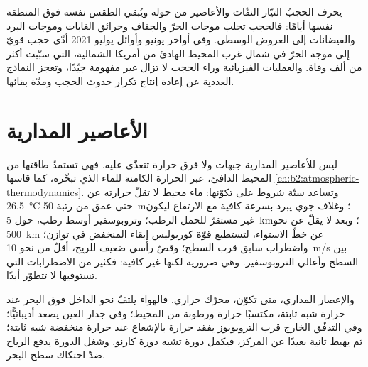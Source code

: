 يحرف الحجبُ التيّار النفّاث والأعاصير من حوله ويُبقي الطقس نفسه فوق المنطقة
نفسها أيامًا: فالحجب تجلب موجات الحرّ والجفاف وحرائق الغابات وموجات البرد والفيضانات إلى
العروض الوسطى. وفي أواخر يونيو وأوائل يوليو 2021 أدّى حجب قويّ إلى موجة الحرّ في
شمال غرب المحيط الهادئ من أمريكا الشمالية، التي سبّبت أكثر من ألف وفاة. والعمليات الفيزيائية
وراء الحجب لا تزال غير مفهومة جيّدًا، وتعجز النماذج العددية عن
إعادة إنتاج تكرار حدوث الحجب ومدّة بقائها.

\section{الأعاصير المدارية}\label{sec:b2:weather-systems:tropical}

ليس للأعاصير المدارية جبهات ولا فرق حرارة تتغذّى عليه. فهي تستمدّ طاقتها
من المحيط الدافئ، عبر الحرارة الكامنة للماء الذي تبخّره، كما قاسها \cref{ch:b2:atmospheric-thermodynamics}.
وتساعد ستّة شروط على تكوّنها: ماء محيط لا تقلّ حرارته عن \qty{26.5}{\celsius}
حتى عمق من رتبة \qty{50}{m}؛ وغلاف جوي يبرد بسرعة كافية مع الارتفاع ليكون
غير مستقرّ للحمل الرطب؛ وتروبوسفير أوسط رطب، حول \qty{5}{km}؛ وبعد
لا يقلّ عن نحو \qty{500}{km} عن خطّ الاستواء، لتستطيع قوّة كوريوليس إبقاء المنخفض في
توازن؛ واضطراب سابق قرب السطح؛ وقصّ رأسي ضعيف للريح، أقلّ من نحو
\qty{10}{m/s} بين السطح وأعالي التروبوسفير. وهي ضرورية لكنها غير
كافية: فكثير من الاضطرابات التي تستوفيها لا تتطوّر أبدًا.

والإعصار المداري، متى تكوّن، محرّك حراري. فالهواء يلتفّ نحو الداخل فوق البحر عند حرارة شبه
ثابتة، مكتسبًا حرارة ورطوبة من المحيط؛ وفي جدار العين يصعد
أديباتيًّا؛ وفي التدفّق الخارج قرب التروبوبوز يفقد حرارة بالإشعاع عند حرارة منخفضة
شبه ثابتة؛ ثم يهبط ثانية بعيدًا عن المركز، فيكمل دورة
تشبه دورة كارنو. وشغل الدورة يدفع الرياح ضدّ احتكاك سطح
البحر.

